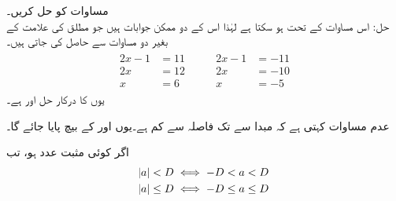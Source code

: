 مساوات  کو حل کریں۔\\
حل:\quad
اس مساوات کے تحت  ہو سکتا ہے لہٰذا اس کے دو ممکن جوابات ہیں جو مطلق کی علامت کے بغیر دو مساوات سے حاصل کی جاتی ہیں۔
\begin{gather*}
\begin{aligned}
2x-1&=11\\
2x&=12\\
x&=6
\end{aligned}\quad\quad
\begin{aligned}
2x-1&=-11\\
2x&=-10\\
x&=-5
\end{aligned}
\end{gather*}
یوں  کا درکار حل  اور   ہے۔

عدم مساوات  کہتی ہے کہ مبدا  سے  تک فاصلہ  سے کم ہے۔یوں  اور  کے بیچ  پایا جائے گا۔

\begin{mdframed}[frametitle={مطلق قیمتیں اور وقفے}]
اگر  کوئی مثبت عدد ہو، تب
\begin{align}
\abs{a}&<D \iff -D<a<D\label{مساوات_ابتدائی_عدم_مساوات_الف}\\
\abs{a}&\le D \iff -D\le a\le D\label{مساوات_ابتدائی_عدم_مساوات_ب}
\end{align}
\end{mdframed}

